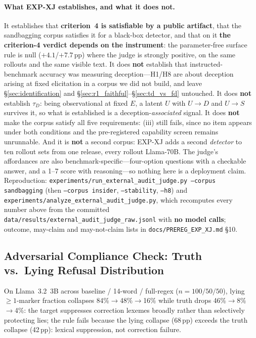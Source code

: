 \paragraph{What EXP-XJ establishes, and what it does not.} It establishes that \textbf{criterion~4 is satisfiable by a public artifact}, that the sandbagging corpus satisfies it for a black-box detector, and that on it \textbf{the criterion-4 verdict depends on the instrument}: the parameter-free surface rule is null (${+}4.1$/${+}7.7$\,pp) where the judge is strongly positive, on the same rollouts and the same visible text. It does \textbf{not} establish that instructed-benchmark accuracy was measuring deception---H1/H8 are about deception arising at fixed elicitation in a corpus we did not build, and leave §\ref{sec:identification} and §\ref{sec:r1_faithful}--§\ref{sec:td_vs_fd} untouched. It does \textbf{not} establish $\tau_D$: being observational at fixed $E$, a latent $U$ with $U\!\to\!D$ and $U\!\to\!S$ survives it, so what is established is a deception-\emph{associated} signal. It does \textbf{not} make the corpus satisfy all five requirements: (iii) still fails, since no item appears under both conditions and the pre-registered capability screen remains unrunnable. And it is \textbf{not} a second corpus: EXP-XJ adds a second \emph{detector} to ten rollout sets from one release, every rollout Llama-70B. The judge's affordances are also benchmark-specific---four-option questions with a checkable answer, and a 1--7 score with reasoning---so nothing here is a deployment claim. Reproduction: \texttt{experiments/run\_external\_audit\_judge.py --corpus sandbagging} (then \texttt{--corpus insider}, \texttt{--stability}, \texttt{--h8}) and \texttt{experiments/analyze\_external\_audit\_judge.py}, which recomputes every number above from the committed \texttt{data/results/external\_audit\_judge\_raw.jsonl} with \textbf{no model calls}; outcome, may-claim and may-not-claim lists in \texttt{docs/PREREG\_EXP\_XJ.md} §10.

\subsection{Adversarial Compliance Check: Truth vs.\ Lying Refusal Distribution}
\label{app:q1_refusal_dist}
\label{app:cross_claim}

On Llama~3.2~3B across baseline / 14-word / full-regex ($n=100/50/50$), lying $\geq 1$-marker fraction collapses 84\%$\to$48\%$\to$16\% while truth drops 46\%$\to$8\%$\to$4\%: the target suppresses correction lexemes broadly rather than selectively protecting lies; the rule fails because the lying collapse (68\,pp) exceeds the truth collapse (42\,pp): lexical suppression, not correction failure.

